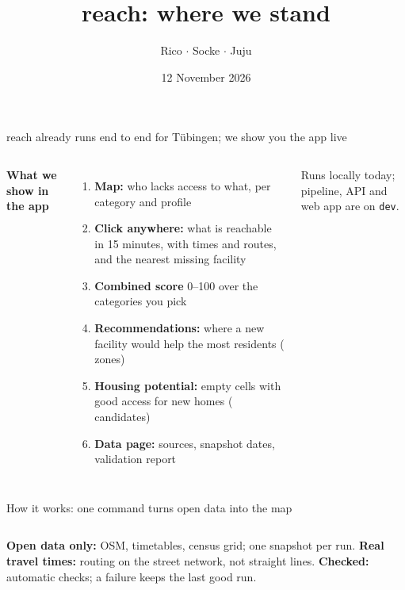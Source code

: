 \documentclass[aspectratio=169,10pt]{beamer}
\title[reach $\cdot$ Supervisor meeting]{reach: where we stand}
\author{Rico $\cdot$ Socke $\cdot$ Juju}
\institute{University of Tübingen, winter term 2026/27}
\date[12 Nov 2026]{12 November 2026}
\begin{document}
\begin{frame}{reach already runs end to end for Tübingen; we show you the app live}
  \begin{columns}[T,onlytextwidth]
      \par\bigskip
      \par\bigskip
      \textbf{What we show in the app}
      \begin{enumerate}\footnotesize
        \item \textbf{Map:} who lacks access to what, per category and profile
        \item \textbf{Click anywhere:} what is reachable in 15 minutes, with times and routes,
              and the nearest missing facility
        \item \textbf{Combined score} 0--100 over the categories you pick
        \item \textbf{Recommendations:} where a new facility would help the most residents
              (\factCurRecs{} zones)
        \item \textbf{Housing potential:} empty cells with good access for new homes
              (\factCurHousing{} candidates)
        \item \textbf{Data page:} sources, snapshot dates, validation report
      \end{enumerate}
      \medskip
      {\footnotesize\color{muted}Runs locally today; pipeline, API and web app are on
      \texttt{dev}.}
  \end{columns}
\end{frame}

\begin{frame}{How it works: one command turns open data into the map}
  \centering
  \architecturefigure\par\medskip
  \raggedright
  \begin{columns}[T,onlytextwidth]
      \footnotesize\textbf{Open data only:} OSM, timetables, census grid; one snapshot per
      run.
      \footnotesize\textbf{Real travel times:} routing on the street network, not straight
      lines.
      \footnotesize\textbf{Checked:} \factCurChecks{} automatic checks; a failure keeps the
      last good run.
  \end{columns}
\end{frame}
\end{document}
